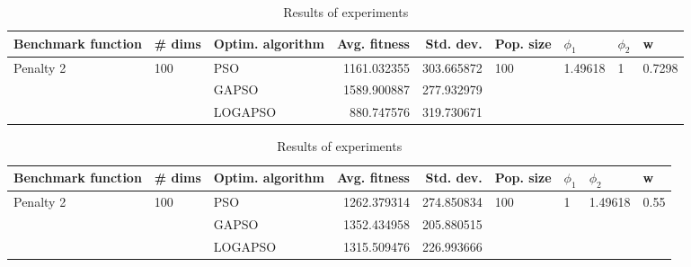 \documentclass{article}
\begin{document}
\begin{table}
\centering
\caption{Results of experiments}
\begin{tabular}{lllrrllll}
\toprule
        Benchmark function &              \# dims & Optim. algorithm &  Avg. fitness &  Std. dev. &            Pop. size &               $\phi_{1}$ &         $\phi_{2}$ &                       w \\
\midrule
\multirow{3}{*}{Penalty 2} & \multirow{3}{*}{100} &              PSO &   1161.032355 & 303.665872 & \multirow{3}{*}{100} & \multirow{3}{*}{1.49618} & \multirow{3}{*}{1} & \multirow{3}{*}{0.7298} \\
                           &                      &            GAPSO &   1589.900887 & 277.932979 &                      &                          &                    &                         \\
                           &                      &          LOGAPSO &    880.747576 & 319.730671 &                      &                          &                    &                         \\
\bottomrule
\end{tabular}
\end{table}
\begin{table}
\centering
\caption{Results of experiments}
\begin{tabular}{lllrrllll}
\toprule
        Benchmark function &              \# dims & Optim. algorithm &  Avg. fitness &  Std. dev. &            Pop. size &         $\phi_{1}$ &               $\phi_{2}$ &                     w \\
\midrule
\multirow{3}{*}{Penalty 2} & \multirow{3}{*}{100} &              PSO &   1262.379314 & 274.850834 & \multirow{3}{*}{100} & \multirow{3}{*}{1} & \multirow{3}{*}{1.49618} & \multirow{3}{*}{0.55} \\
                           &                      &            GAPSO &   1352.434958 & 205.880515 &                      &                    &                          &                       \\
                           &                      &          LOGAPSO &   1315.509476 & 226.993666 &                      &                    &                          &                       \\
\bottomrule
\end{tabular}
\end{table}
\end{document}
